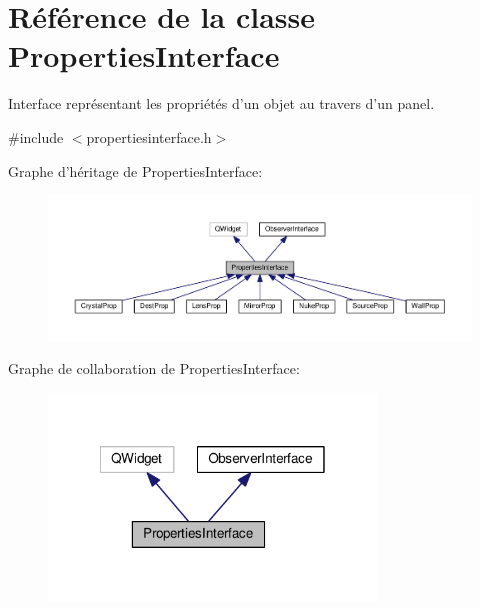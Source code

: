\hypertarget{classPropertiesInterface}{\section{Référence de la classe Properties\+Interface}
\label{classPropertiesInterface}
}


Interface représentant les propriétés d'un objet au travers d'un panel.  




{\ttfamily \#include $<$propertiesinterface.\+h$>$}



Graphe d'héritage de Properties\+Interface\+:\nopagebreak
\begin{figure}[H]
\begin{center}
\leavevmode
\includegraphics[width=350pt]{d5/d18/classPropertiesInterface__inherit__graph}
\end{center}
\end{figure}


Graphe de collaboration de Properties\+Interface\+:\nopagebreak
\begin{figure}[H]
\begin{center}
\leavevmode
\includegraphics[width=247pt]{da/d04/classPropertiesInterface__coll__graph}
\end{center}
\end{figure}
